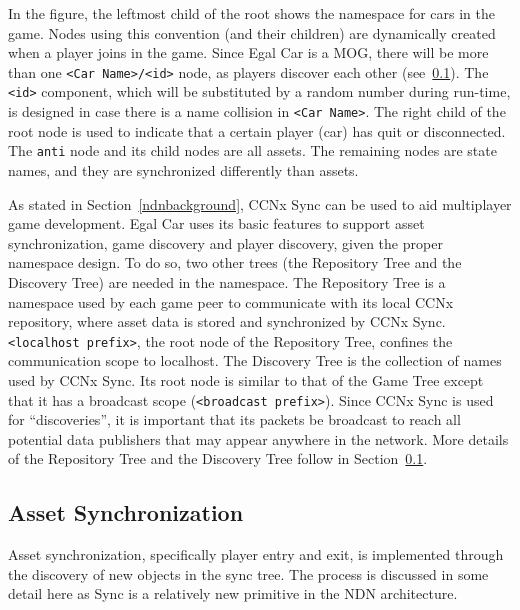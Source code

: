 \documentclass{article}
\begin{document}
In the figure, the leftmost child of the root shows the namespace for cars in the game. Nodes using this convention (and their children) are dynamically created when a player joins in the game. Since Egal Car is a MOG, there will be more than one \texttt{<Car Name>/<id>} node, as players discover each other (see~\ref{assetsynchronization}). The \texttt{<id>} component, which will be substituted by a random number during run-time, is designed in case there is a name collision in \texttt{<Car Name>}. The right child of the root node is used to indicate that a certain player (car) has quit or disconnected. The \texttt{anti} node and its child nodes are all assets. The remaining nodes are state names, and they are synchronized differently than assets.

As stated in Section~\ref{ndnbackground}, CCNx Sync can be used to aid multiplayer game development. Egal Car uses its basic features to support asset synchronization, game discovery and player discovery, given the proper namespace design.
To do so, two other trees (the Repository Tree and the Discovery Tree) are needed in the namespace.  The Repository Tree is a namespace used by each game peer to communicate with its local CCNx repository, where asset data is stored and synchronized by CCNx Sync. \texttt{<localhost prefix>}, the root node of the Repository Tree, confines the communication scope to localhost. The Discovery Tree is the collection of names used by CCNx Sync. Its root node is similar to that of the Game Tree except that it has a broadcast scope (\texttt{<broadcast prefix>}). Since CCNx Sync is used for ``discoveries'', it is important that its packets be broadcast to reach all potential data publishers that may appear anywhere in the network. More details of the Repository Tree and the Discovery Tree follow in Section~\ref{assetsynchronization}.

\subsection{Asset Synchronization}
\label{assetsynchronization}

Asset synchronization, specifically player entry and exit, is implemented through the discovery of new objects in the sync tree. The process is discussed in some detail here as Sync is a relatively new primitive in the NDN architecture. 
\end{document}

